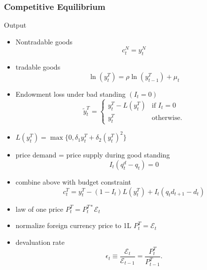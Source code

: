 \documentclass[mathserif]{beamer}
\begin{document}
    \begin{frame}[allowframebreaks]
        \frametitle{Competitive Equilibrium}
        Output
        \begin{itemize}
            \item Nontradable goods
            \begin{equation}
                c^N_t = y^N_t
            \end{equation}
            \item tradable goods
                \begin{equation}
                    \label{eq:ar1-output}
                    \ln(y_t^T) = \rho \ln(y^T_{t-1}) + \mu_t
                \end{equation}
            \item Endowment loss under bad standing $(I_t= 0)$
                \begin{equation}
                    \label{eq:ytt}
                    \tilde{y}^T_t =
                        \begin{cases}
                        y^T_t  - L(y^T_t) & \text{if } I_t = 0 \\
                        y^T_t & \text{otherwise.}
                        \end{cases}
                \end{equation}
            \item $L(y^T_t) = \max \{0, \delta_1 y^T_t + \delta_2 (y^T_t)^2\}$
                \framebreak
            \item price demand = price supply during good standing
                \begin{equation}
                    \label{eq:qq}
                    I_t(q^d_t - q_t) = 0
                \end{equation}
            \item combine above with budget constraint
                \begin{equation}
                    \label{eq:market-clearing}
                    c^T_t = y^T_t - (1 - I_t)L(y^T_t) + I_t(q_t d_{t+1} - d_t)
                \end{equation}
                \framebreak
            \item law of one price $P^T_t = P^{T*}_t \mathcal{E}_t$
            \item normalize foreign currency price to 1L $P^T_t = \mathcal{E}_t$
            \item devaluation rate
                \begin{equation}
                    \label{eq:devaluation-rate}
                    \epsilon_t \equiv \frac{\mathcal{E}_t}{\mathcal{E}_{t-1}} = \frac{P^T_t}{P^T_{t-1}}.
                \end{equation}
            \end{itemize}
    \end{frame}
\end{document}

